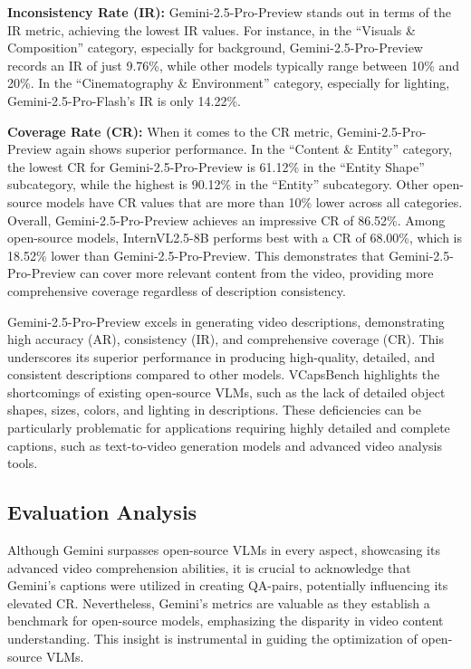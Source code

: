\textbf{Inconsistency Rate (IR):} Gemini-2.5-Pro-Preview stands out in terms of the IR metric, achieving the lowest IR values. For instance, in the ``Visuals \& Composition'' category, especially for background, Gemini-2.5-Pro-Preview records an IR of just 9.76\%, while other models typically range between 10\% and 20\%. In the ``Cinematography \& Environment'' category, especially for lighting, Gemini-2.5-Pro-Flash's IR is only 14.22\%.

\textbf{Coverage Rate (CR):} When it comes to the CR metric, Gemini-2.5-Pro-Preview again shows superior performance. In the ``Content \& Entity'' category, the lowest CR for Gemini-2.5-Pro-Preview is 61.12\% in the ``Entity Shape'' subcategory, while the highest is 90.12\% in the ``Entity'' subcategory. Other open-source models have CR values that are more than 10\% lower across all categories. Overall, Gemini-2.5-Pro-Preview achieves an impressive CR of 86.52\%. Among open-source models, InternVL2.5-8B performs best with a CR of 68.00\%, which is 18.52\% lower than Gemini-2.5-Pro-Preview. This demonstrates that Gemini-2.5-Pro-Preview can cover more relevant content from the video, providing more comprehensive coverage regardless of description consistency. 

Gemini-2.5-Pro-Preview excels in generating video descriptions, demonstrating high accuracy (AR), consistency (IR), and comprehensive coverage (CR). This underscores its superior performance in producing high-quality, detailed, and consistent descriptions compared to other models. VCapsBench highlights the shortcomings of existing open-source VLMs, such as the lack of detailed object shapes, sizes, colors, and lighting in descriptions. These deficiencies can be particularly problematic for applications requiring highly detailed and complete captions, such as text-to-video generation models and advanced video analysis tools.


\subsection{Evaluation Analysis}
Although Gemini surpasses open-source VLMs in every aspect, showcasing its advanced video comprehension abilities, it is crucial to acknowledge that Gemini's captions were utilized in creating QA-pairs, potentially influencing its elevated CR. Nevertheless, Gemini's metrics are valuable as they establish a benchmark for open-source models, emphasizing the disparity in video content understanding. This insight is instrumental in guiding the optimization of open-source VLMs.

